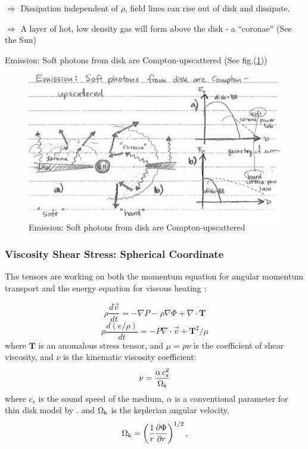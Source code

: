 \begin{enumerate}[a)]
$\Rightarrow$ Dissipation independent of $\rho$, field lines can rise out of disk and dissipate.

$\Rightarrow$ A layer of hot, low density gas will form above the disk - a ``coronae'' (See the Sun)

Emission: Soft photons from disk are Compton-upscattered (See fig.(\ref{fig:coronae}))
\begin{figure}[!htbp]
   \centering
   \includegraphics[width=\textwidth]{HighEnergy/note02}
   \caption{Emission: Soft photons from disk are Compton-upscattered}
   \label{fig:coronae}
\end{figure}

\end{enumerate}

\subsubsection{Viscosity Shear Stress: Spherical Coordinate}

The tensors are working on both the momentum equation for angular momentum transport and 
the energy equation for viscous heating \cite{Stone:99}:

\begin{equation}\label{eq:mom}
    \rho \frac{d \vec{v}}{d t} = - \nabla P - \rho \nabla \Phi + \nabla \cdot \boldsymbol{T}
\end{equation}
\begin{equation}
    \rho \frac{d(e/\rho)}{dt} = -P \nabla \cdot \vec{v} + \boldsymbol{T}^{2}/\mu
\end{equation}
where $\boldsymbol{T}$ is an anomalous stress tensor, and $\mu = \rho \nu$ is the coefficient of shear viscosity,
and $\nu$ is the kinematic viscosity coefficient:
\begin{equation}
    \nu = \frac{\alpha \, c_{s}^{2}}{\Omega_{\rm k}}
\end{equation}
where $c_{s}$ is the sound speed of the medium, $\alpha$ is a conventional parameter for thin
disk model by \cite{Shakura:73}.  and $\Omega_{\rm k}$ is the keplerian angular velocity,
\begin{equation}
    \Omega_{\rm k} = \left( \frac{1}{r} \frac{\partial \Phi}{\partial r} \right)^{1/2},
\end{equation}

